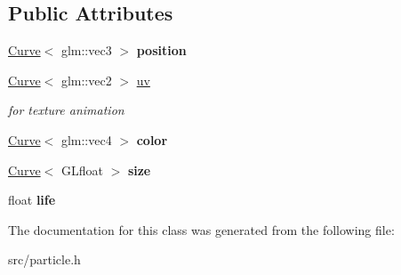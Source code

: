 \subsection*{Public Attributes}
\begin{DoxyCompactItemize}
\item 
\hypertarget{class_particle_a31b8e2a4c6f8c10ea00878599b7d40b6}{}\hyperlink{class_curve}{Curve}$<$ glm\+::vec3 $>$ {\bfseries position}\label{class_particle_a31b8e2a4c6f8c10ea00878599b7d40b6}

\item 
\hypertarget{class_particle_a819fdee7e19d9b4a804bd65c3b1ed10a}{}\hyperlink{class_curve}{Curve}$<$ glm\+::vec2 $>$ \hyperlink{class_particle_a819fdee7e19d9b4a804bd65c3b1ed10a}{uv}\label{class_particle_a819fdee7e19d9b4a804bd65c3b1ed10a}

\begin{DoxyCompactList}\small\item\em for texture animation \end{DoxyCompactList}\item 
\hypertarget{class_particle_a6b07b59be5260cf2694ecb02165ad7bd}{}\hyperlink{class_curve}{Curve}$<$ glm\+::vec4 $>$ {\bfseries color}\label{class_particle_a6b07b59be5260cf2694ecb02165ad7bd}

\item 
\hypertarget{class_particle_aa023368080fd9cb8b533cc5124452c7e}{}\hyperlink{class_curve}{Curve}$<$ G\+Lfloat $>$ {\bfseries size}\label{class_particle_aa023368080fd9cb8b533cc5124452c7e}

\item 
\hypertarget{class_particle_a1760a331eebb54cbdd6ca280439a36c8}{}float {\bfseries life}\label{class_particle_a1760a331eebb54cbdd6ca280439a36c8}

\end{DoxyCompactItemize}


The documentation for this class was generated from the following file\+:\begin{DoxyCompactItemize}
\item 
src/particle.\+h\end{DoxyCompactItemize}
